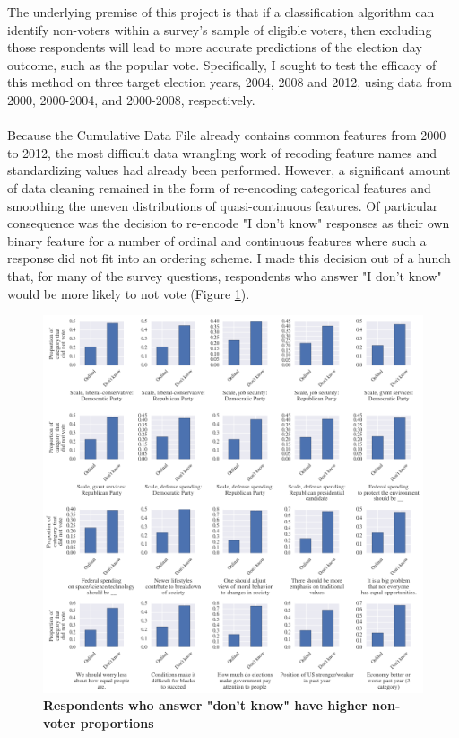 \documentclass{article}
\begin{document}
	The underlying premise of this project is that if a classification algorithm can identify non-voters within a survey's sample of eligible voters, then excluding those respondents will lead to more accurate predictions of the election day outcome, such as the popular vote. Specifically, I sought to test the efficacy of this method on three target election years, 2004, 2008 and 2012, using data from 2000, 2000-2004, and 2000-2008, respectively.
	\\\\
	Because the Cumulative Data File already contains common features from 2000 to 2012, the most difficult data wrangling work of recoding feature names and standardizing values had already been performed. However, a significant amount of data cleaning remained in the form of re-encoding categorical features and smoothing the uneven distributions of quasi-continuous features. Of particular consequence was the decision to re-encode "I don't know" responses as their own binary feature for a number of ordinal and continuous features where such a response did not fit into an ordering scheme. I made this decision out of a hunch that, for many of the survey questions, respondents who answer "I don't know" would be more likely to not vote (Figure \ref{fig:ordinal_dk}). \\
	\begin{figure}[h!]
		\begin{center}
			\includegraphics*[width=.79\linewidth]{ordinal_dk}
			\caption{\textbf{Respondents who answer "don't know" have higher non-voter proportions}}
			\label{fig:ordinal_dk}
		\end{center}
	\end{figure}
\end{document}
